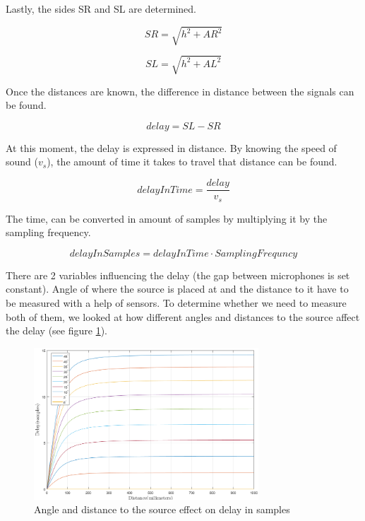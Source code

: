 \newpage
Lastly, the sides SR and SL are determined.

\begin{equation}
	SR = \sqrt{h^2 + AR^2}
\end{equation}

\begin{equation}
	SL = \sqrt{h^2 + AL^2}
\end{equation}

Once the distances are known, the difference in distance between the signals can be 
found.

\begin{equation}
	delay = SL - SR
\end{equation}

At this moment, the delay is expressed in distance. By knowing the speed of sound 
(\(v_s\)), the amount of time it takes to travel that distance can be found.

\begin{equation}
	delayInTime = \frac{delay}{v_s}
\end{equation}

The time, can be converted in amount of samples by multiplying it by the sampling 
frequency.

\begin{equation}
	delayInSamples = delayInTime \cdot SamplingFrequncy
\end{equation}

There are 2 variables influencing the delay (the gap between microphones is 
set constant). Angle of where the source is placed at and the distance to it have 
to be measured with a help of sensors. To determine whether we need to measure both 
of them, we looked at how different angles and distances to the source affect the 
delay (see figure \ref{fig:anglesDistDelay}).

\begin{figure}[htp]
	\centering
	\includegraphics[width=0.75\textwidth]{Illustrations/distanceMatters.png}
	\caption{Angle and distance to the source effect on delay in samples}
	\label{fig:anglesDistDelay}
\end{figure}

